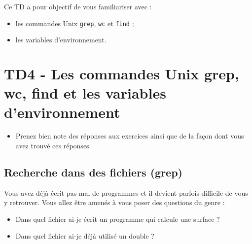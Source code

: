 \documentclass[a4paper,11pt]{article}
\date{2018 -- 2019}
\begin{document}
\entete
\titre
{}
\lastedit


	\begin{tcolorbox}[blanker,
	before skip=10mm,after skip=10mm,
	borderline west={1mm}{-4mm}{lightgray},
	title=Objectifs, coltitle=black, fonttitle=\sffamily\bfseries\large]
	Ce TD a pour objectif de vous familiariser avec :
	\begin{itemize}
		\item les commandes Unix \verb_grep_, \verb_wc_ et \verb_find_ ;
		\item les variables d'environnement.  
	\end{itemize}
	\end{tcolorbox}
	
	\tableofcontents

	\newpage


\section{TD4 - Les commandes Unix grep, wc, find et les variables d'environnement}
	 \begin{consigne}
	 	\begin{itemize}
			\item Prenez bien note des r\'eponses aux exercices ainsi que de la fa\c con dont vous avez trouv\'e ces r\'eponses.
		\end{itemize}				
	\end{consigne}
	
	\subsection{Recherche dans des fichiers (grep)}
	
		Vous avez d\'ej\`a \'ecrit pas mal de programmes et il devient parfois difficile de vous y retrouver. Vous allez \^etre amen\'es \`a vous poser des questions du genre :
				
            	\par
        
		\begin{itemize}
				\item Dans quel fichier ai-je \'ecrit un programme qui calcule une surface ?
				\item Dans quel fichier ai-je d\'ej\`a utilis\'e un double ?
		\end{itemize}
        
\end{document}

